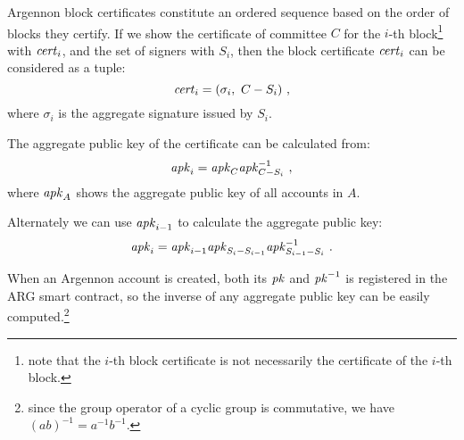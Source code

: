Argennon block certificates constitute an ordered sequence based on the order of blocks they certify. If we show
the certificate of committee $C$ for the $i$-th block\footnote{note that the $i$-th block certificate is not
necessarily the certificate of the $i$-th block.} with $\mathit{cert}_i$, and the set of signers
with $S_i$, then the block certificate $\mathit{cert}_i$ can be considered as a tuple:
\begin{equation}
    \C_i=(\sigma_i,\ C-S_{i})\label{eq:cert}\ ,
\end{equation}
where $\sigma_i$ is the aggregate signature issued by $S_i$.

The aggregate public key of the certificate can
be calculated from:
\begin{equation}
    \APK_i=\APK_C\APK_{C-S_i}^{-1}\label{eq:aggCertPK}\ ,
\end{equation}
where $\mathit{apk}_{A}$ shows the aggregate public key of all accounts in $A$.

Alternately we can use $\mathit{apk}_{i-1}$ to calculate the aggregate public key:
\begin{equation}
    \APK_i=\APK_{i-1}\APK_{S_i-S_{i-1}}\APK_{S_{i-1}-S_i}^{-1}\ .\label{eq:aggPK-2}
\end{equation}

When an Argennon account is created, both its $\mathit{pk}$ and $\mathit{pk}^{-1}$ is registered in the ARG smart contract, so the
inverse of any aggregate public key can be easily computed.\footnote{since the group operator of a cyclic
group is commutative, we have $(ab)^{-1}=a^{-1}b^{-1}$.}


